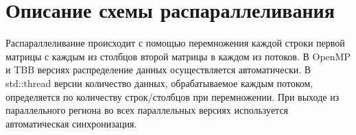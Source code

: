 \documentclass{report}
\begin{document}
\section*{Описание схемы распараллеливания}
\par Распараллеливание происходит с помощью перемножения каждой строки первой матрицы с каждым из столбцов второй матрицы в каждом из потоков. В OpenMP и TBB версиях распределение данных осуществляется автоматически. В std::thread версии количество данных, обрабатываемое каждым потоком, определяется по количеству строк/столбцов при перемножении. При выходе из параллельного региона во всех параллельных версиях используется автоматическая синхронизация.

\newpage

\end{document}
